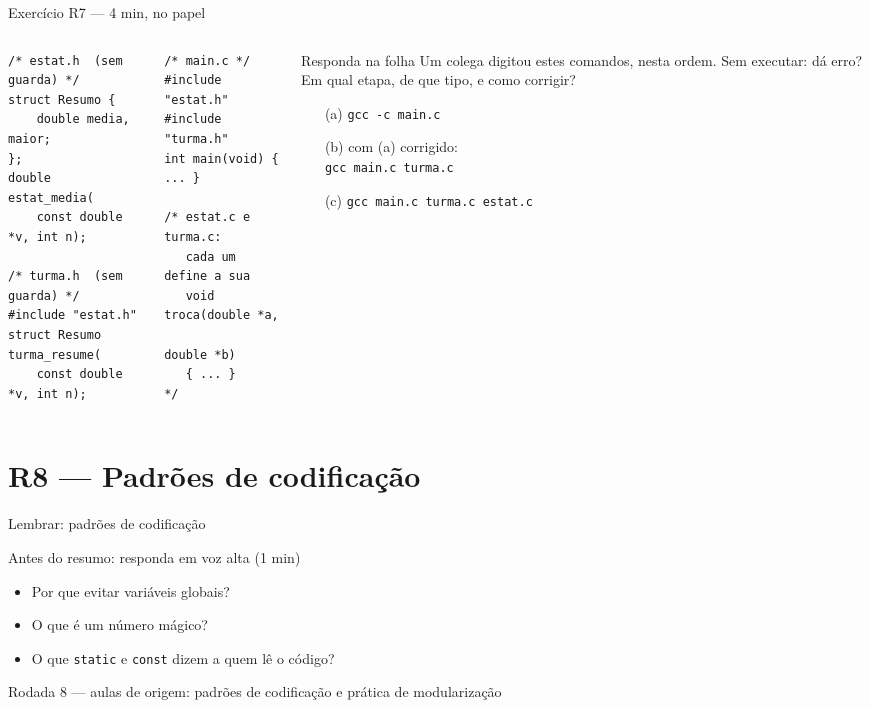 \documentclass[aspectratio=169]{beamer}
\newcommand{\rodada}[4]{%
  \begin{frame}{Lembrar: #2}
    \begin{block}{Antes do resumo: responda em voz alta (1 min)}
      #4
    \end{block}
    \vfill
    {\small\textcolor{UFSGray}{Rodada #1 --- aulas de origem:} #3}
  \end{frame}}
\begin{document}
\begin{frame}[fragile]{Exercício R7 --- 4 min, no papel}
  \begin{columns}[T]
    \begin{column}{0.33\textwidth}
\begin{lstlisting}[style=tinyC]
/* estat.h  (sem guarda) */
struct Resumo {
    double media, maior;
};
double estat_media(
    const double *v, int n);

/* turma.h  (sem guarda) */
#include "estat.h"
struct Resumo turma_resume(
    const double *v, int n);
\end{lstlisting}
    \end{column}
    \begin{column}{0.30\textwidth}
\begin{lstlisting}[style=tinyC]
/* main.c */
#include "estat.h"
#include "turma.h"
int main(void) { ... }

/* estat.c e turma.c:
   cada um define a sua
   void troca(double *a,
              double *b)
   { ... }            */
\end{lstlisting}
    \end{column}
    \begin{column}{0.33\textwidth}
      \begin{block}{Responda na folha}
        \scriptsize Um colega digitou estes comandos, nesta ordem. Sem
        executar: dá erro? Em qual etapa, de que tipo, e como corrigir?
        \begin{enumerate}
          \item[(a)] \texttt{gcc -c main.c}
          \item[(b)] com (a) corrigido:\\\texttt{gcc main.c turma.c}
          \item[(c)] \texttt{gcc main.c turma.c estat.c}
        \end{enumerate}
      \end{block}
    \end{column}
  \end{columns}
\end{frame}

\section{R8 --- Padrões de codificação}

\rodada{8}{padrões de codificação}{padrões de codificação e prática de modularização}{
  \begin{itemize}
    \item Por que evitar variáveis globais?
    \item O que é um número mágico?
    \item O que \texttt{static} e \texttt{const} dizem a quem lê o código?
  \end{itemize}}
\end{document}
